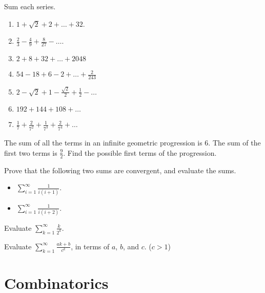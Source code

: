 \documentclass[12pt]{amsart}
\theoremstyle{definition}
\begin{document}
\problem   Sum each series.\vspace{.1in}
	\begin{enumerate}
		\item $1+\sqrt{2}+2+\dots + 32$.\vspace{.1in}
		\item $\frac{2}{3}-\frac{4}{9}+\frac{8}{27}-\dots$.\vspace{.1in}
		\item $2+8+32+\dots+2048$ \vspace{.1in}
		\item $54-18+6-2+\dots+\frac{2}{243}$ \vspace{.1in}
		\item $2-\sqrt{2}+1-\frac{\sqrt{2}}{2}+\frac12-\dots$ \vspace{.1in}
		\item $192+144+108+\dots$ \vspace{.1in}
		\item $\frac{1}{7}+\frac{2}{7^2}+\frac{1}{7^3}+\frac{2}{7^4}+\dots$\vspace{.05in}
	\end{enumerate}

\problem The sum of all the terms in an infinite geometric progression is 6.  The sum of the first two terms is $\frac92$.  Find the possible first terms of the progression.\vspace{.05in}

\problem Prove that the following two sums are convergent, and evaluate the sums.\vspace{.05in}
\begin{itemize}
	\item $\displaystyle \sum_{i=1}^{\infty}\frac{1}{i(i+1)}$.\vspace{.1in}

	\item $\displaystyle \sum_{i=1}^{\infty}\frac{1}{i(i+2)}$.
\end{itemize}\vspace{.05in}

\problem Evaluate $\displaystyle \sum_{k=1}^{\infty}\frac{k}{2^k}$.\vspace{.05in}

\problem Evaluate $\displaystyle \sum_{k=1}^{\infty}\frac{ak+b}{c^k}$, in terms of $a$, $b$, and $c$. ($c>1$)

\newpage
\section{Combinatorics}
\end{document}
